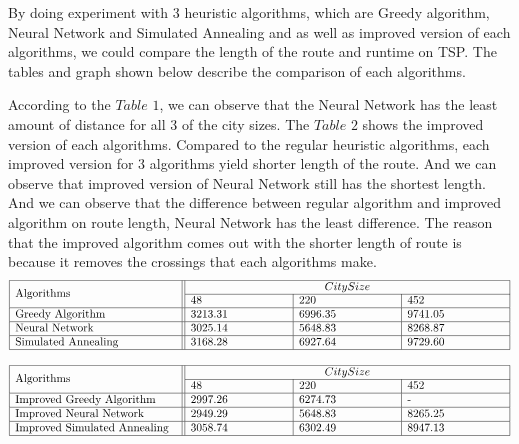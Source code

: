 \documentclass[12pt]{article}
\begin{document}
By doing experiment with 3 heuristic algorithms, which are Greedy algorithm, Neural Network and Simulated Annealing and as well as improved version of each algorithms, we could compare the length of the route and runtime on TSP. The tables and graph shown below describe the comparison of each algorithms. \par

According to the $Table$ $1$, we can observe that the Neural Network has the least amount of distance for all 3 of the city sizes. The $Table$ $2$ shows the improved version of each algorithms. Compared to the regular heuristic algorithms, each improved version for 3 algorithms yield shorter length of the route. And we can observe that improved version of Neural Network still has the shortest length. And we can observe that the difference between regular algorithm and improved algorithm on route length, Neural Network has the least difference. The reason that the improved algorithm comes out with the shorter length of route is because it removes the crossings that each algorithms make.
\begin{displaymath}
    \begin{array} {|p{5cm}||p{3cm}|p{3cm}|p{3cm}|}
  	  \hline
      \multirow{2}{*}{Algorithms} & \multicolumn{3}{c|}{City Size} \\
      \cline{2-4}
      & 48 & 220 & 452 \\
      \hline
      Greedy Algorithm & 3213.31 & 6996.35 & 9741.05 \\
      \hline
      Neural Network & 3025.14 & 5648.83 & 8268.87 \\
      \hline
      Simulated Annealing & 3168.28 & 6927.64 & 9729.60 \\
      \hline
    \end{array}
  \end{displaymath}

    \begin{displaymath}
    \begin{array} {|p{5cm}||p{3cm}|p{3cm}|p{3cm}|}
  	  \hline
      \multirow{2}{*}{Algorithms} & \multicolumn{3}{c|}{City Size} \\
      \cline{2-4}
      & 48 & 220 & 452 \\
      \hline
      Improved Greedy Algorithm & 2997.26 & 6274.73 & - \\
      \hline
      Improved Neural Network & 2949.29 & 5648.83 & 8265.25 \\
      \hline
      Improved Simulated Annealing & 3058.74 & 6302.49 & 8947.13 \\
      \hline
    \end{array}
  \end{displaymath}
\end{document}
